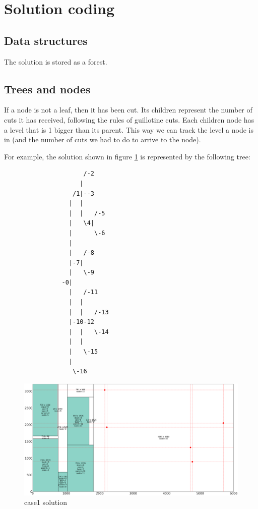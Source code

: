 \documentclass{roadef}
\begin{document}
\section{Solution coding}

    \subsection{Data structures}

        The solution is stored as a forest.

    \subsection{Trees and nodes}

        If a node is not a leaf, then it has been cut. Its children represent the number of cuts it has received, following the rules of guillotine cuts.
        Each children node has a level that is 1 bigger than its parent. This way we can track the level a node is in (and the number of cuts we had to do to arrive to the node).

        For example, the solution shown in figure \ref{fig:case1} is represented by the following tree:

        \begin{verbatim}
                      /-2
                     |
                   /1|--3
                  |  |
                  |  |   /-5
                  |   \4|
                  |      \-6
                  |
                  |   /-8
                  |-7|
                  |   \-9
                -0|
                  |   /-11
                  |  |
                  |  |   /-13
                  |-10-12
                  |  |   \-14
                  |  |
                  |   \-15
                  |
                   \-16

        \end{verbatim}

        \begin{figure}
            \centering
            \includegraphics[width=0.7\linewidth]{case1_heur.png}
            \caption{case1 solution} \label{fig:case1}
        \end{figure}
\end{document}
